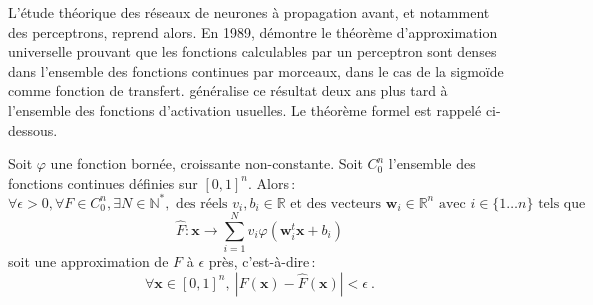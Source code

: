 L'étude théorique des réseaux de neurones à propagation avant, et notamment des perceptrons, reprend alors. En 1989, \citet{cybenko_approximation_1989} démontre le théorème d'approximation universelle prouvant que les fonctions calculables par un perceptron sont denses dans l'ensemble des fonctions continues par morceaux, dans le cas de la sigmoïde comme fonction de transfert. \citet{hornik_approximation_1991} généralise ce résultat deux ans plus tard à l'ensemble des fonctions d'activation usuelles. Le théorème formel est rappelé ci-dessous.

\begin{theorem}
Soit $\varphi$ une fonction bornée, croissante non-constante. Soit $C_0^n$ l'ensemble des fonctions continues définies sur $[0,1]^n$. Alors\,:
$$\forall \epsilon > 0, \forall F \in C_0^n, \exists N \in \mathbb{N}^{*}, \text{ des réels } v_i, b_i \in \mathbb{R} \text{ et des vecteurs } \mathbf{w}_i \in \mathbb{R}^n \text{ avec } i \in \{1\dots{}n\} \text{ tels que}$$
$$\hat{F} : \mathbf{x} \rightarrow \sum_{i=1}^N v_i \varphi\left(\mathbf{w}_i^t \mathbf{x} + b_i \right)$$
soit une approximation de $F$ à $\epsilon$ près, c'est-à-dire\,:
$$\forall \mathbf{x} \in [0,1]^n, ~\left| F(\mathbf{x}) - \hat{F}(\mathbf{x}) \right| < \epsilon~.$$
\end{theorem}

